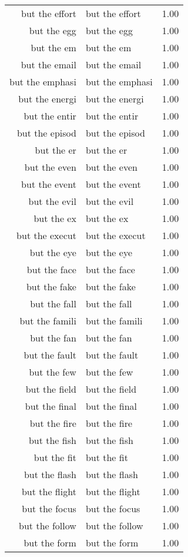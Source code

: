 \begin{table}[ht]
\begin{tabular}{rlr}
  but the effort & but the effort & 1.00 \\ 
  but the egg & but the egg & 1.00 \\ 
  but the em & but the em & 1.00 \\ 
  but the email & but the email & 1.00 \\ 
  but the emphasi & but the emphasi & 1.00 \\ 
  but the energi & but the energi & 1.00 \\ 
  but the entir & but the entir & 1.00 \\ 
  but the episod & but the episod & 1.00 \\ 
  but the er & but the er & 1.00 \\ 
  but the even & but the even & 1.00 \\ 
  but the event & but the event & 1.00 \\ 
  but the evil & but the evil & 1.00 \\ 
  but the ex & but the ex & 1.00 \\ 
  but the execut & but the execut & 1.00 \\ 
  but the eye & but the eye & 1.00 \\ 
  but the face & but the face & 1.00 \\ 
  but the fake & but the fake & 1.00 \\ 
  but the fall & but the fall & 1.00 \\ 
  but the famili & but the famili & 1.00 \\ 
  but the fan & but the fan & 1.00 \\ 
  but the fault & but the fault & 1.00 \\ 
  but the few & but the few & 1.00 \\ 
  but the field & but the field & 1.00 \\ 
  but the final & but the final & 1.00 \\ 
  but the fire & but the fire & 1.00 \\ 
  but the fish & but the fish & 1.00 \\ 
  but the fit & but the fit & 1.00 \\ 
  but the flash & but the flash & 1.00 \\ 
  but the flight & but the flight & 1.00 \\ 
  but the focus & but the focus & 1.00 \\ 
  but the follow & but the follow & 1.00 \\ 
  but the form & but the form & 1.00 \\ 

\end{tabular}
\end{table}
